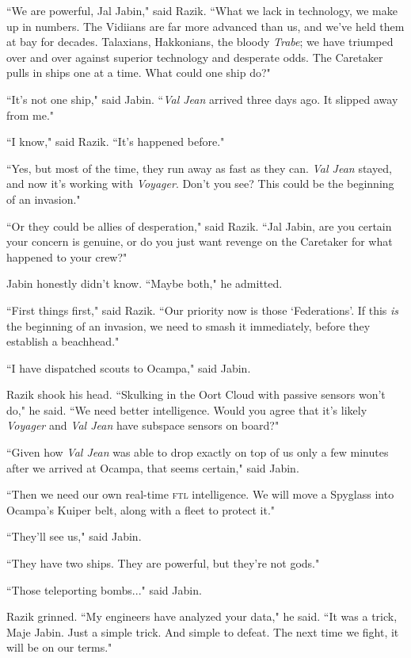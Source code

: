 \documentclass[twoside,letterpaper,12pt]{memoir}
\begin{document}
``We are powerful, Jal Jabin," said Razik. ``What we lack in technology, we make up in numbers. The Vidiians are far more advanced than us, and we've held them at bay for decades. Talaxians, Hakkonians, the bloody \textit{Trabe}; we have triumped over and over against superior technology and desperate odds. The Caretaker pulls in ships one at a time. What could one ship do?"

``It's not one ship," said Jabin. ``\textit{Val Jean} arrived three days ago. It slipped away from me."

``I know," said Razik. ``It's happened before."

``Yes, but most of the time, they run away as fast as they can. \textit{Val Jean} stayed, and now it's working with \textit{Voyager}. Don't you see? This could be the beginning of an invasion."

``Or they could be allies of desperation," said Razik. ``Jal Jabin, are you certain your concern is genuine, or do you just want revenge on the Caretaker for what happened to your crew?"

Jabin honestly didn't know. ``Maybe both," he admitted.

``First things first," said Razik. ``Our priority now is those `Federations'. If this \textit{is} the beginning of an invasion, we need to smash it immediately, before they establish a beachhead."

``I have dispatched scouts to Ocampa," said Jabin.

Razik shook his head. ``Skulking in the Oort Cloud with passive sensors won't do," he said. ``We need better intelligence. Would you agree that it's likely \textit{Voyager} and \textit{Val Jean} have subspace sensors on board?"

``Given how \textit{Val Jean} was able to drop exactly on top of us only a few minutes after we arrived at Ocampa, that seems certain," said Jabin.

``Then we need our own real-time \textsc{ftl} intelligence. We will move a Spyglass into Ocampa's Kuiper belt, along with a fleet to protect it."

``They'll see us," said Jabin.

``They have two ships. They are powerful, but they're not gods."

``Those teleporting bombs..." said Jabin.

Razik grinned. ``My engineers have analyzed your data," he said. ``It was a trick, Maje Jabin. Just a simple trick. And simple to defeat. The next time we fight, it will be on our terms."
\end{document}
